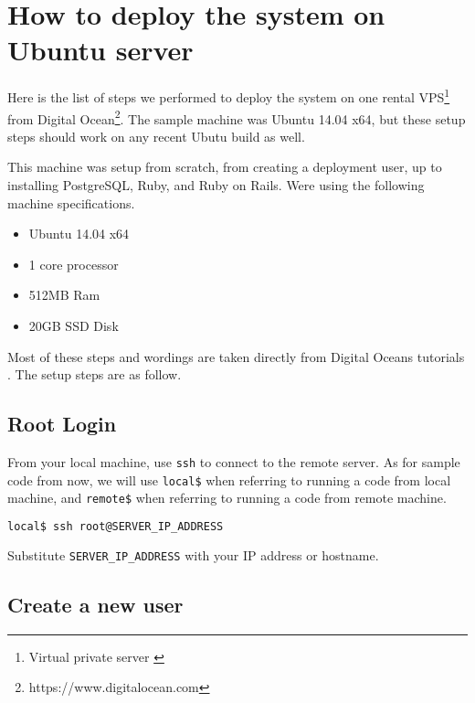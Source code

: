 \chapter{How to deploy the system on Ubuntu server}

Here is the list of steps we performed to deploy the system on one rental
VPS\footnote{Virtual private server \cite[]{vps}} from Digital Ocean\footnote{https://www.digitalocean.com}.
The sample machine was Ubuntu 14.04 x64, but these setup steps should work
on any recent Ubutu build as well.

This machine was setup from scratch, from creating a deployment user, up to
installing PostgreSQL, Ruby, and Ruby on Rails. We\textquotesingle re using the following
machine specifications.

\begin{itemize}
  \item Ubuntu 14.04 x64
  \item 1 core processor
  \item 512MB Ram
  \item 20GB SSD Disk
\end{itemize}

Most of these steps and wordings are taken directly from Digital Ocean\textquotesingle s
tutorials \cite[]{ubuntu} \cite[]{ubuntu2}. The setup steps are as follow.

\section{Root Login}

From your local machine, use \texttt{ssh} to connect to the remote server.
As for sample code from now, we will use \texttt{local\$} when referring
to running a code from local machine, and \texttt{remote\$} when referring
to running a code from remote machine.

\begin{minipage}{\linewidth}
\begin{lstlisting}[language=bash]
local$ ssh root@SERVER_IP_ADDRESS
\end{lstlisting}
\end{minipage}

Substitute \texttt{SERVER\_IP\_ADDRESS} with your IP address or hostname.

\section{Create a new user}

